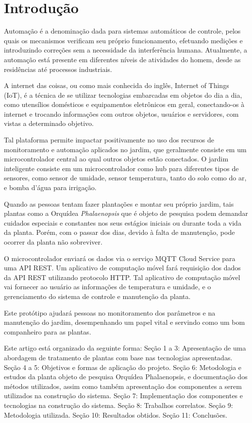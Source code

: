 \documentclass[conference]{IEEEtran}
\begin{document}
\section{Introdução}

Automação é a denominação dada para sistemas automáticos de controle, pelos quais os mecanismos verificam seu próprio funcionamento, efetuando medições e introduzindo correções sem a necessidade da interferência humana. Atualmente, a automação está presente em diferentes níveis de atividades do homem, desde as residências até processos industriais.

A internet das coisas, ou como mais conhecida do inglês, Internet of Things (IoT), é a técnica de se utilizar tecnologias embarcadas em objetos do dia a dia, como utensílios domésticos e equipamentos eletrônicos em geral, conectando-os à internet e trocando informações com outros objetos, usuários e servidores, com vistas a determinado objetivo.

Tal plataforma permite impactar positivamente no uso dos recursos de monitoramento e automação aplicados no jardim, que geralmente consiste em um microcontrolador central ao qual outros objetos estão conectados. O jardim inteligente consiste em um microcontrolador como hub para diferentes tipos de sensores, como sensor de umidade, sensor temperatura, tanto do solo como do ar, e bomba d’água para irrigação.

Quando as pessoas tentam fazer plantações e montar seu próprio jardim, tais plantas como a Orquídea {\itshape{Phalaenopsis}} que é objeto de pesquisa podem demandar cuidados especiais e constantes nos seus estágios iniciais ou durante toda a vida da planta. Porém, com o passar dos dias, devido à falta de manutenção, pode ocorrer da planta não sobreviver.

O microcontrolador enviará os dados via o serviço MQTT Cloud Service para uma API REST. Um aplicativo de computação móvel fará requisição dos dados da API REST utilizando protocolo HTTP. Tal aplicativo de computação móvel vai fornecer ao usuário as informações de temperatura e umidade, e o gerenciamento do sistema de controle e manutenção da planta.

Este protótipo ajudará pessoas no monitoramento dos parâmetros e na manutenção do jardim, desempenhando um papel vital e servindo como um bom companheiro para as plantas.

Este artigo está organizado da seguinte forma: Seção 1 a 3: Apresentação de uma abordagem de tratamento de plantas com base nas tecnologias apresentadas. Seção 4 a 5: Objetivos e formas de aplicação do projeto. Seção 6: Metodologia e estudos da planta objeto de pesquisa Orquídea Phalaenopsis, e documentação dos métodos utilizados, assim como também apresentação dos componentes a serem utilizados na construção do sistema. Seção 7: Implementação dos componentes e tecnologias na construção do sistema. Seção 8: Trabalhos correlatos. Seção 9: Metodologia utilizada. Seção 10: Resultados obtidos. Seção 11: Conclusões.
\end{document}
